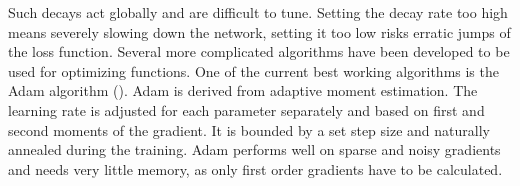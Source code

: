 Such decays act globally and are difficult to tune. Setting the decay rate too high means severely slowing down the network, setting it too low risks erratic jumps of the loss function. Several more complicated algorithms have been developed to be used for optimizing functions. One of the current best working algorithms is the Adam algorithm (\cite{adam}). Adam is derived from adaptive moment estimation. The learning rate is adjusted for each parameter separately and based on first and second moments of the gradient. It is bounded by a set step size and naturally annealed during the training. Adam performs well on sparse and noisy gradients and needs very little memory, as only first order gradients have to be calculated.
